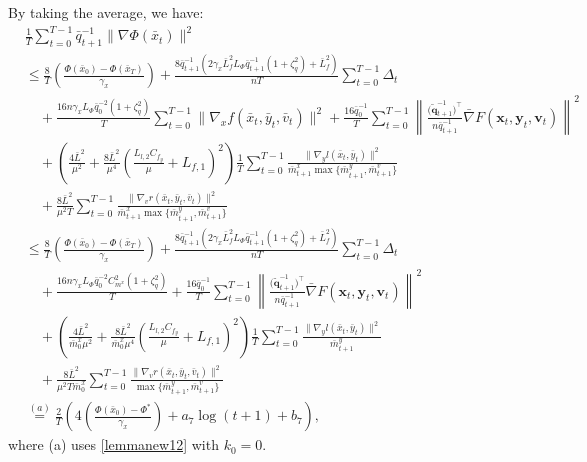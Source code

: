 \documentclass{article}
\theoremstyle{plain}
\theoremstyle{definition}
\theoremstyle{remark}
\begin{document}
By taking the average, we have:
\begin{align}
&\frac{1}{T}\sum_{t=0}^{T-1}{\bar{q}_{t+1}^{-1}}\|\nabla \Phi(\bar{x}_t)\|^2\nonumber\\
&\leq\frac{8}{T}\left(\frac{\Phi(\bar{x}_0)-\Phi(\bar{x}_{T})}{\gamma_x}\right)+\frac{8\bar{q}_{t+1}^{-1}(2\gamma_x \bar{L}_{f}^2L_\Phi \bar{q}_{t+1}^{-1} \left(1 +\zeta_q^2\right)+\bar{L}_{f}^2)}{nT} \sum_{t=0}^{T-1}\Delta_t\nonumber\\
&\quad +\frac{16n\gamma_x L_\Phi \bar{q}_{0}^{-2} \left(1 +\zeta_q^2\right)}{T}\sum_{t=0}^{T-1}\|\nabla_x f(\bar{x}_t, \bar{y}_t, \bar{v}_t)\|^2
+ \frac{16\bar{q}_{0}^{-1}}{T}\sum_{t=0}^{T-1}  \left\| \frac{\big(\tilde{\mathbf{q}}_{t+1}^{-1}\big)^\top}{n\bar{q}_{t+1}^{-1}} \bar{\nabla} F(\mathbf{x}_t, \mathbf{y}_t, \mathbf{v}_t) \right\|^2 \nonumber \\
&\quad +\left( \frac{4\bar{L}^2}{\mu^2} + \frac{8\bar{L}^2}{\mu^4} \left( \frac{L_{l,2} C_{f_y}}{\mu} + L_{f,1} \right)^2 \right) \frac{1}{T}\sum_{t=0}^{T-1}\frac{\|\nabla_y l(\bar{x}_t, \bar{y}_t)\|^2}{\bar{m}^x_{t+1}\max\{\bar{m}^y_{t+1},\bar{m}^v_{t+1}\}}\nonumber\\
&\quad+ \frac{8\bar{L}^2 }{\mu^2T}\sum_{t=0}^{T-1}\frac{\|\nabla_v r(\bar{x}_t, \bar{y}_t, \bar{v}_t)\|^2}{\bar{m}^x_{t+1}\max\{\bar{m}^y_{t+1},\bar{m}^v_{t+1}\}}\nonumber\\
&\leq\frac{8}{T}\left(\frac{\Phi(\bar{x}_0)-\Phi(\bar{x}_{T})}{\gamma_x}\right)+\frac{8\bar{q}_{t+1}^{-1}(2\gamma_x \bar{L}_{f}^2L_\Phi \bar{q}_{t+1}^{-1} \left(1 +\zeta_q^2\right)+\bar{L}_{f}^2)}{nT}  \sum_{t=0}^{T-1}\Delta_t\nonumber\\
&\quad +\frac{16n\gamma_x L_\Phi \bar{q}_{0}^{-2} C_{m^x}^2\left(1 +\zeta_q^2\right)}{T}
+ \frac{16 \bar{q}_{0}^{-1}}{T}\sum_{t=0}^{T-1}  \left\| \frac{\big(\tilde{\mathbf{q}}_{t+1}^{-1}\big)^\top}{n\bar{q}_{t+1}^{-1}} \bar{\nabla} F(\mathbf{x}_t, \mathbf{y}_t, \mathbf{v}_t) \right\|^2 \nonumber \\
&\quad +\left( \frac{4\bar{L}^2}{\bar{m}^x_{0}\mu^2} + \frac{8\bar{L}^2}{\bar{m}^x_{0}\mu^4} \left( \frac{L_{l,2} C_{f_y}}{\mu} + L_{f,1} \right)^2 \right)\frac{1}{T} \sum_{t=0}^{T-1}\frac{\|\nabla_y l(\bar{x}_t, \bar{y}_t)\|^2}{\bar{m}^y_{t+1}}\nonumber\\
&\quad+ \frac{8\bar{L}^2 }{\mu^2T\bar{m}^x_{0}}\sum_{t=0}^{T-1}\frac{\|\nabla_v r(\bar{x}_t, \bar{y}_t, \bar{v}_t)\|^2}{\max\{\bar{m}^y_{t+1},\bar{m}^v_{t+1}\}}\nonumber\\
&\overset{(a)}{=}\frac{2}{T}\left(4\left(\frac{\Phi(\bar{x}_{0})-\Phi^*}{\gamma_x}\right)+a_7\log(t+1)+b_7\right),\label{eq139}
\end{align}
where (a) uses \cref{lemmanew12} with $k_0=0$.
\end{document}
